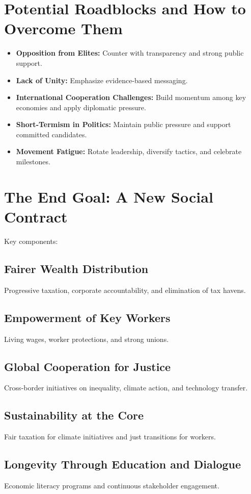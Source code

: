 \documentclass[11pt,a4paper]{article}
\begin{document}
\section{Potential Roadblocks and How to Overcome Them}
\begin{itemize}
  \item \textbf{Opposition from Elites:} Counter with transparency and strong public support.
  \item \textbf{Lack of Unity:} Emphasize evidence-based messaging.
  \item \textbf{International Cooperation Challenges:} Build momentum among key economies and apply diplomatic pressure.
  \item \textbf{Short-Termism in Politics:} Maintain public pressure and support committed candidates.
  \item \textbf{Movement Fatigue:} Rotate leadership, diversify tactics, and celebrate milestones.
\end{itemize}

\section{The End Goal: A New Social Contract}
Key components:
\subsection{Fairer Wealth Distribution}
Progressive taxation, corporate accountability, and elimination of tax havens.

\subsection{Empowerment of Key Workers}
Living wages, worker protections, and strong unions.

\subsection{Global Cooperation for Justice}
Cross-border initiatives on inequality, climate action, and technology transfer.

\subsection{Sustainability at the Core}
Fair taxation for climate initiatives and just transitions for workers.

\subsection{Longevity Through Education and Dialogue}
Economic literacy programs and continuous stakeholder engagement.
\end{document}
